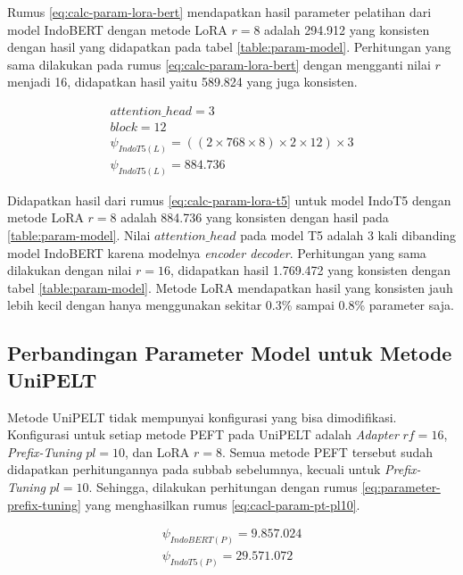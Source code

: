 Rumus \ref{eq:calc-param-lora-bert} mendapatkan hasil parameter pelatihan dari model IndoBERT dengan metode LoRA $r=8$ adalah 294.912 yang konsisten dengan hasil yang didapatkan pada tabel \ref{table:param-model}. Perhitungan yang sama dilakukan pada rumus \ref{eq:calc-param-lora-bert} dengan mengganti nilai $r$ menjadi 16, didapatkan hasil yaitu 589.824 yang juga konsisten.

\begin{equation}
    \begin{aligned}
        attention\_head = 3 \\
        block = 12 \\
        \psi_{IndoT5(L)} = ((2 \times 768 \times 8) \times 2 \times 12) \times 3 \\
        \psi_{IndoT5(L)} = 884.736
    \end{aligned}
    \label{eq:calc-param-lora-t5}
\end{equation}

Didapatkan hasil dari rumus \ref{eq:calc-param-lora-t5} untuk model IndoT5 dengan metode LoRA $r=8$ adalah 884.736 yang konsisten dengan hasil pada \ref{table:param-model}. Nilai $attention\_head$ pada model T5 adalah 3 kali dibanding model IndoBERT karena modelnya \textit{encoder decoder}. Perhitungan yang sama dilakukan dengan nilai $r=16$, didapatkan hasil 1.769.472 yang konsisten dengan tabel \ref{table:param-model}. Metode LoRA mendapatkan hasil yang konsisten jauh lebih kecil dengan hanya menggunakan sekitar 0.3\% sampai 0.8\% parameter saja.

\subsection{Perbandingan Parameter Model untuk Metode UniPELT}

Metode UniPELT tidak mempunyai konfigurasi yang bisa dimodifikasi. Konfigurasi untuk setiap metode PEFT pada UniPELT adalah \textit{Adapter} $rf=16$, \textit{Prefix-Tuning} $pl=10$, dan LoRA $r=8$. Semua metode PEFT tersebut sudah didapatkan perhitungannya pada subbab sebelumnya, kecuali untuk \textit{Prefix-Tuning} $pl=10$. Sehingga, dilakukan perhitungan dengan rumus \ref{eq:parameter-prefix-tuning} yang menghasilkan rumus \ref{eq:cacl-param-pt-pl10}.

\begin{equation}
    \begin{aligned}
        \psi_{IndoBERT(P)} = 9.857.024 \\
        \psi_{IndoT5(P)} = 29.571.072 \\
    \end{aligned}
    \label{eq:cacl-param-pt-pl10}
\end{equation}

